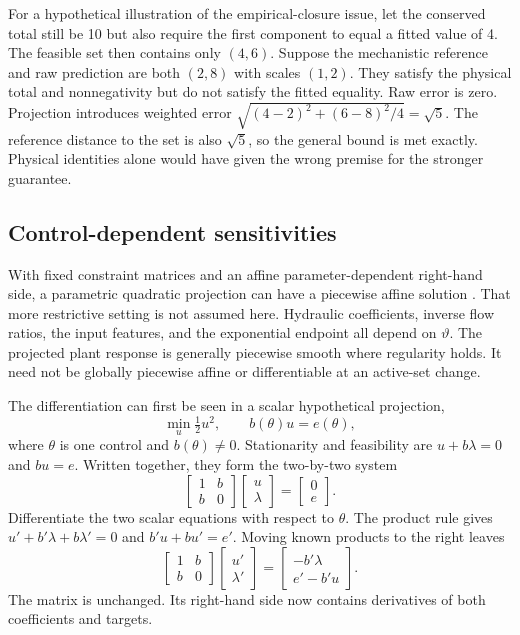 For a hypothetical illustration of the empirical-closure issue, let the conserved total still be 10 but also require the first component to equal a fitted value of 4. The feasible set then contains only $(4,6)$. Suppose the mechanistic reference and raw prediction are both $(2,8)$ with scales $(1,2)$. They satisfy the physical total and nonnegativity but do not satisfy the fitted equality. Raw error is zero. Projection introduces weighted error $\sqrt{(4-2)^2+(6-8)^2/4}=\sqrt5$. The reference distance to the set is also $\sqrt5$, so the general bound is met exactly. Physical identities alone would have given the wrong premise for the stronger guarantee.

\subsection{Control-dependent sensitivities}

With fixed constraint matrices and an affine parameter-dependent right-hand side, a parametric quadratic projection can have a piecewise affine solution \citep{Tondel2003}. That more restrictive setting is not assumed here. Hydraulic coefficients, inverse flow ratios, the input features, and the exponential endpoint all depend on $\vartheta$. The projected plant response is generally piecewise smooth where regularity holds. It need not be globally piecewise affine or differentiable at an active-set change.

The differentiation can first be seen in a scalar hypothetical projection,
\begin{equation}
\min_u\tfrac12u^2,\qquad b(\theta)u=e(\theta),
\end{equation}
where $\theta$ is one control and $b(\theta)\ne0$. Stationarity and feasibility are $u+b\lambda=0$ and $bu=e$. Written together, they form the two-by-two system
\begin{equation}
\begin{bmatrix}1&b\\b&0\end{bmatrix}
\begin{bmatrix}u\\\lambda\end{bmatrix}
=\begin{bmatrix}0\\e\end{bmatrix}.
\end{equation}
Differentiate the two scalar equations with respect to $\theta$. The product rule gives $u'+b'\lambda+b\lambda'=0$ and $b'u+bu'=e'$. Moving known products to the right leaves
\begin{equation}
\begin{bmatrix}1&b\\b&0\end{bmatrix}
\begin{bmatrix}u'\\\lambda'\end{bmatrix}
=\begin{bmatrix}-b'\lambda\\e'-b'u\end{bmatrix}.
\end{equation}
The matrix is unchanged. Its right-hand side now contains derivatives of both coefficients and targets.

